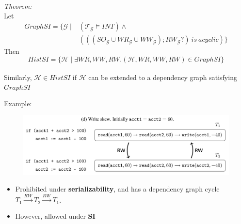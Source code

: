 \documentclass{beamer}
\begin{document}
\begin{frame}
	\textit{Theorem:} \\
	Let
	$$
		\begin{aligned}
		GraphSI = 
			\{ 
				\mathcal{G} 
				\mid &
				\left( \mathcal{T}_\mathcal{G} \vDash INT \right) \wedge \\
					 & \left(
						\left(
							\left(
								SO_\mathcal{G} \cup WR_\mathcal{G} \cup WW_\mathcal{G}
							\right)  ; RW_\mathcal{G}?
					\right) \ is \ acyclic
				\right)
			\}	
		\end{aligned}
	$$
	Then
	$$
		HistSI = \{ \mathcal{H} \mid \exists WR, WW, RW. (\mathcal{H}, WR, WW, RW) \in GraphSI \}
	$$
	\\
	Similarly, $\mathcal{H} \in HistSI$ if $\mathcal{H}$ can be extended to a dependency graph satisfying $GraphSI$ 
\end{frame}


\begin{frame}
Example:
\begin{figure}
	\includegraphics[scale=0.25]{fig2d}
\end{figure}
\begin{itemize}
	\item Prohibited under \textbf{serializability}, and has a dependency graph cycle $ T_1 \xrightarrow{RW} T_2 \xrightarrow{RW} T_1 $.
	\item However, allowed under \textbf{SI}
\end{itemize}
\end{frame}
\end{document}
